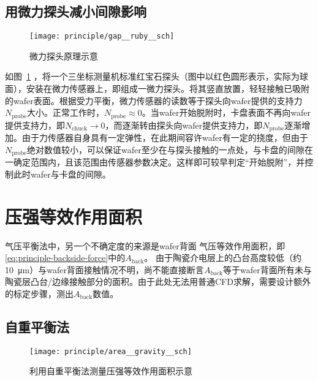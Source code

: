 \subsection{用微力探头减小间隙影响}\label{principle-gap-ruby}

\begin{figure}[tbhp]
\centering
\texttt{[image: principle/gap\_\_ruby\_\_sch]}
\caption{微力探头原理示意}
\label{fig:principle-gap-ruby-sch}
\end{figure}

如图~\ref{fig:principle-gap-ruby-sch} ，将一个三坐标测量机标准红宝石探头（图中以红色圆形表示，实际为球面），安装在微力传感器上，即组成一微力探头。将其竖直放置，轻轻接触已吸附的wafer表面。根据受力平衡，微力传感器的读数等于探头向wafer提供的支持力$N_{\mathrm{probe}}$大小。正常工作时，$N_{\mathrm{probe}} \approx 0$。当wafer开始脱附时，卡盘表面不再向wafer提供支持力，即$N_{\mathrm{chuck}} \to 0$，而逐渐转由探头向wafer提供支持力，即$N_{\mathrm{probe}}$逐渐增加。由于力传感器自身具有一定弹性，在此期间容许wafer有一定的挠度，但由于$N_{\mathrm{probe}}$绝对数值较小，可以保证wafer至少在与探头接触的一点处，与卡盘的间隙在一确定范围内，且该范围由传感器参数决定。这样即可较早判定“开始脱附”，并控制此时wafer与卡盘的间隙。




\section{压强等效作用面积}\label{principle-area}

气压平衡法中，另一个不确定度的来源是wafer背面 气压等效作用面积，即\eqref{eq:principle-backside-force}中的$A_{\mathrm{back}}$。
由于陶瓷介电层上的凸台高度较低（约\SI{10}{\micro\meter}）与wafer背面接触情况不明，尚不能直接断言$A_{\mathrm{back}}$等于wafer背面所有未与陶瓷层凸台/边缘接触部分的面积。由于此处无法用普通CFD求解，需要设计额外的标定步骤，测出$A_{\mathrm{back}}$数值。


\subsection{自重平衡法}\label{sec:principle-area-gravity}

\begin{figure}[tbhp]
\centering
\texttt{[image: principle/area\_\_gravity\_\_sch]}
\caption[自重法测等效面积示意]{利用自重平衡法测量压强等效作用面积示意}
\label{fig:principle-area-gravity-sch}
\end{figure}

